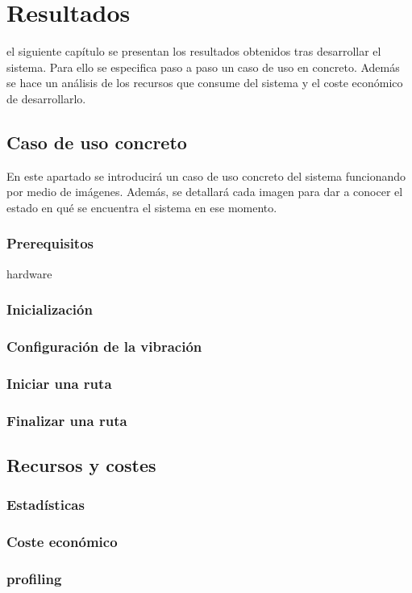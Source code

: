 \chapter{Resultados}
\label{chap:resultados}

 el siguiente capítulo se presentan los resultados obtenidos tras desarrollar el
sistema. Para ello se especifica paso a paso un caso de uso en concreto. Además se hace un análisis
de los recursos que consume del sistema y el coste económico de desarrollarlo.

\section{Caso de uso concreto}
En este apartado se introducirá un caso de uso concreto del sistema funcionando por medio de
imágenes. Además, se detallará cada imagen para dar a conocer el estado en qué se encuentra el
sistema en ese momento.

\subsection{Prerequisitos}
hardware
\subsection{Inicialización}
\subsection{Configuración de la vibración}
\subsection{Iniciar una ruta}
\subsection{Finalizar una ruta}

\section{Recursos y costes}
\subsection{Estadísticas}
\subsection{Coste económico}
\subsection{profiling}

